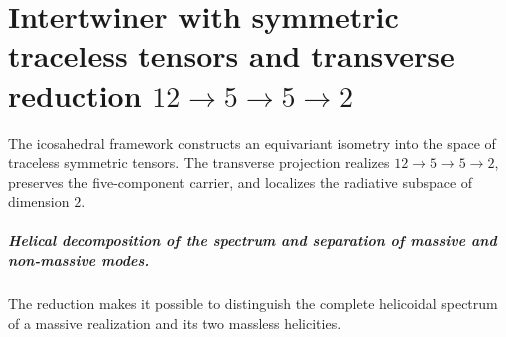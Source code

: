 \chapter{Intertwiner with symmetric traceless tensors and transverse reduction \texorpdfstring{\(12\to5\to5\to2\)}{12→5→5→2}}
\label{chap:parte-iv-64}

The icosahedral framework constructs an equivariant isometry into the space of traceless symmetric tensors. The transverse projection realizes \(12\to5\to5\to2\), preserves the five-component carrier, and localizes the radiative subspace of dimension \(2\).



\paragraph{Helical decomposition of the spectrum and separation of massive and non-massive modes.} The reduction makes it possible to distinguish the complete helicoidal spectrum of a massive realization and its two massless helicities.

